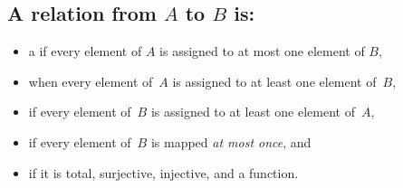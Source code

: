 \documentclass[twoside,11pt]{article}
\begin{document}

\subsection*{A relation from $A$ to $B$ is:}
\begin{itemize}
\item a  if every element of $A$ is assigned to at most one element of $B$,

\item
{} when every element of~$A$ is assigned to at least one element
of~$B$,

\item
{} if every element of~$B$ is assigned to at least one
element of~$A$,

\item
{} if every element of~$B$ is mapped \emph{at most
  once}, and

\item
{} if it is total, surjective, injective, and a
function.
\end{itemize}
\end{document}
